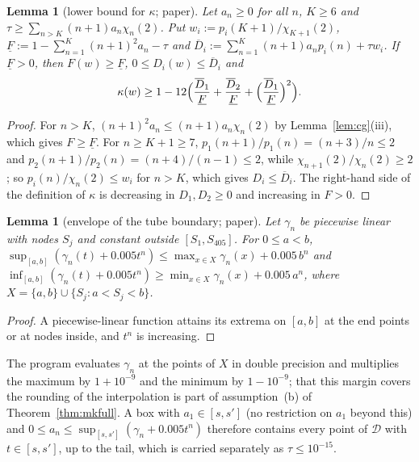 \documentclass[11pt,a4paper]{article}
\newtheorem{lemma}[theorem]{Lemma}
\theoremstyle{definition}
\theoremstyle{remark}
\newcommand{\cD}{\mathcal{D}}
\begin{document}
\begin{lemma}[lower bound for $\kappa$; paper]\label{lem:kappa}
Let $a_n\ge0$ for all $n$, $K\ge6$ and $\tau\ge\sum_{n>K}(n+1)a_n\chi_n(2)$.
Put $w_i:=p_i(K+1)/\chi_{K+1}(2)$, $\underline F:=1-\sum_{n=1}^K(n+1)^2a_n-\tau$ and $\overline D_i:=\sum_{n=1}^{K}(n+1)a_np_i(n)+\tau w_i$.
If $\underline F>0$, then $F(w)\ge\underline F$, $0\le D_i(w)\le\overline D_i$ and
\[
\kappa(w)\ge1-12\Bigl(\frac{\overline D_1}{\underline F}+\frac{\overline D_2}{\underline F}+\Bigl(\frac{\overline D_1}{\underline F}\Bigr)^2\Bigr).
\]
\end{lemma}
\begin{proof}
For $n>K$, $(n+1)^2a_n\le(n+1)a_n\chi_n(2)$ by Lemma~\ref{lem:cg}(iii), which gives $F\ge\underline F$.
For $n\ge K+1\ge7$, $p_1(n+1)/p_1(n)=(n+3)/n\le2$ and $p_2(n+1)/p_2(n)=(n+4)/(n-1)\le2$, while $\chi_{n+1}(2)/\chi_n(2)\ge2$; so $p_i(n)/\chi_n(2)\le w_i$ for $n>K$, which gives $D_i\le\overline D_i$.
The right-hand side of the definition of $\kappa$ is decreasing in $D_1,D_2\ge0$ and increasing in $F>0$.
\end{proof}

\begin{lemma}[envelope of the tube boundary; paper]\label{lem:env}
Let $\gamma_n$ be piecewise linear with nodes $S_j$ and constant outside $[S_1,S_{405}]$.
For $0\le a<b$, $\sup_{[a,b]}(\gamma_n(t)+0.005t^n)\le\max_{x\in X}\gamma_n(x)+0.005\,b^n$ and $\inf_{[a,b]}(\gamma_n(t)+0.005t^n)\ge\min_{x\in X}\gamma_n(x)+0.005\,a^n$, where $X=\{a,b\}\cup\{S_j:a<S_j<b\}$.
\end{lemma}
\begin{proof}
A piecewise-linear function attains its extrema on $[a,b]$ at the end points or at nodes inside, and $t^n$ is increasing.
\end{proof}
The program evaluates $\gamma_n$ at the points of $X$ in double precision and multiplies the maximum by $1+10^{-9}$ and the minimum by $1-10^{-9}$; that this margin covers the rounding of the interpolation is part of assumption~(b) of Theorem~\ref{thm:mkfull}.
A box with $a_1\in[s,s']$ (no restriction on $a_1$ beyond this) and $0\le a_n\le\sup_{[s,s']}(\gamma_n+0.005t^n)$ therefore contains every point of $\cD$ with $t\in[s,s']$, up to the tail, which is carried separately as $\tau\le10^{-15}$.
\end{document}
